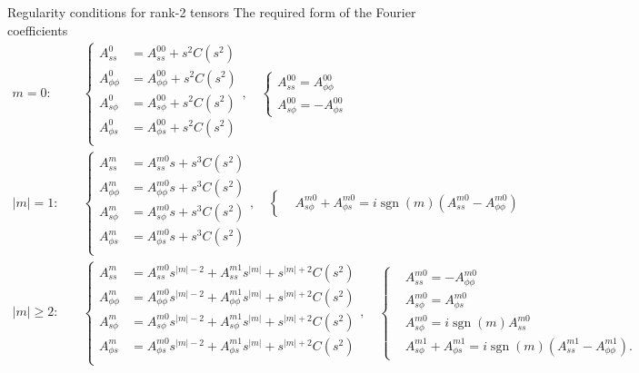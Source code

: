 \documentclass[11pt,aspectratio=169]{beamer}
\DeclareMathOperator{\sgn}{sgn}
\begin{document}
\begin{frame}{Regularity conditions for rank-2 tensors}
	The required form of the Fourier coefficients
	\[
		\begin{aligned}
			m = 0 :& \quad \left\{\begin{aligned}
				A_{ss}^0 &= A_{ss}^{00} + s^2 C(s^2) \\ 
				A_{\phi\phi}^0 &= A_{\phi\phi}^{00} + s^2 C(s^2) \\ 
				A_{s\phi}^0 &= A_{s\phi}^{00} + s^2 C(s^2) \\ 
				A_{\phi s}^0 &= A_{\phi s}^{00} + s^2 C(s^2) \\ 
			\end{aligned}\right.,\quad 
			\left\{\begin{aligned}
				A_{ss}^{00} = A_{\phi\phi}^{00} \\ 
				A_{s\phi}^{00} = -A_{\phi s}^{00}
			\end{aligned}\right. \\ 
			|m| = 1 :& \quad \left\{\begin{aligned}
				A_{ss}^m &= A_{ss}^{m0} s + s^3 C(s^2) \\
				A_{\phi\phi}^m &= A_{\phi\phi}^{m0} s + s^{3} C(s^2) \\
				A_{s\phi}^m &= A_{s\phi}^{m0} s + s^{3} C(s^2) \\
				A_{\phi s}^m &= A_{\phi s}^{m0} s + s^{3} C(s^2) \\
			\end{aligned}\right.,\quad \left\{\begin{aligned}
				&A_{s\phi}^{m0} + A_{\phi s}^{m0} = i\sgn(m) \left(A_{ss}^{m0} - A_{\phi\phi}^{m0}\right)
			\end{aligned}\right. \\
			|m| \geq 2 :& \quad \left\{\begin{aligned}
				A_{ss}^m &= A_{ss}^{m0} s^{|m|-2} + A_{ss}^{m1} s^{|m|} + s^{|m|+2} C(s^2) \\
				A_{\phi\phi}^m &= A_{\phi\phi}^{m0} s^{|m|-2} + A_{\phi \phi}^{m1} s^{|m|} + s^{|m|+2} C(s^2) \\
				A_{s\phi}^m &= A_{s\phi}^{m0} s^{|m|-2} + A_{s\phi}^{m1} s^{|m|} + s^{|m|+2} C(s^2) \\
				A_{\phi s}^m &= A_{\phi s}^{m0} s^{|m|-2} + A_{\phi s}^{m1} s^{|m|} + s^{|m|+2} C(s^2) \\
			\end{aligned}\right.,\quad \left\{\begin{aligned}
				&A_{ss}^{m0} = - A_{\phi\phi}^{m0}\\
				&A_{s\phi}^{m0} = A_{\phi s}^{m0} \\ 
				&A_{s\phi}^{m0} = i \sgn(m) A_{ss}^{m0} \\ 
				&A_{s\phi}^{m1} + A_{\phi s}^{m1} = i\sgn(m)\left(A_{ss}^{m1} - A_{\phi\phi}^{m1}\right).
			\end{aligned}\right.
		\end{aligned}
	\]
\end{frame}
\end{document}

